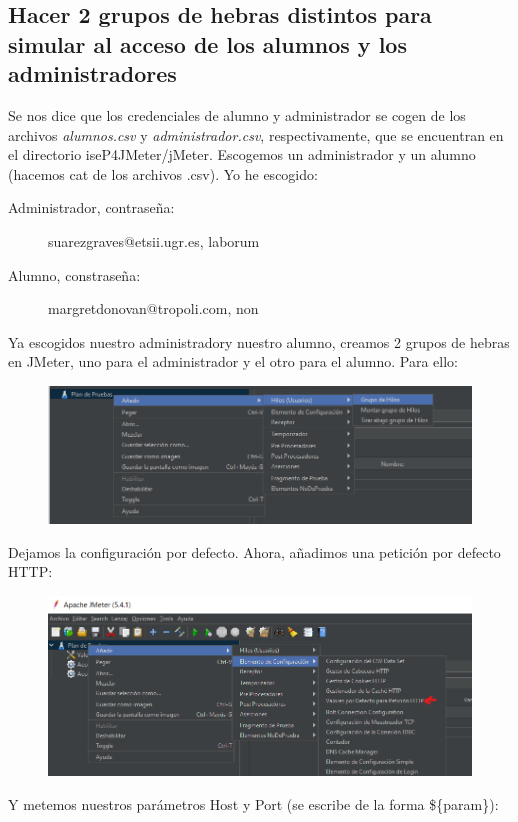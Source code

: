 \documentclass[a4paper]{article}
\begin{document}
\subsection{Hacer 2 grupos de hebras distintos para simular al acceso de los alumnos
y los administradores}
Se nos dice que los credenciales de alumno y administrador se cogen de los archivos
\textsl{alumnos.csv} y \textsl{administrador.csv}, respectivamente, que se encuentran en
el directorio iseP4JMeter/jMeter.
Escogemos un administrador y un alumno (hacemos cat de los archivos .csv). Yo he escogido:
\begin{description}
    \item[Administrador, contraseña:] suarezgraves@etsii.ugr.es, laborum
    \item[Alumno, constraseña:] margretdonovan@tropoli.com, non  
\end{description}
Ya escogidos nuestro administradory nuestro alumno, creamos 2 grupos de hebras 
en JMeter, uno para el administrador y el otro para el alumno. Para ello:
\begin{figure}[hbt!]
    \centering
    \includegraphics[width=\textwidth]{crear grupo hilos.png}
\end{figure}
Dejamos la configuración por defecto. \newline
Ahora, añadimos una petición por defecto HTTP:
\begin{figure}[hbt!]
    \includegraphics[width=\textwidth]{valores por defecto peticion.png}
\end{figure}
\newline Y metemos nuestros parámetros Host y Port (se escribe de la forma \$\{param\}):
\end{document}
